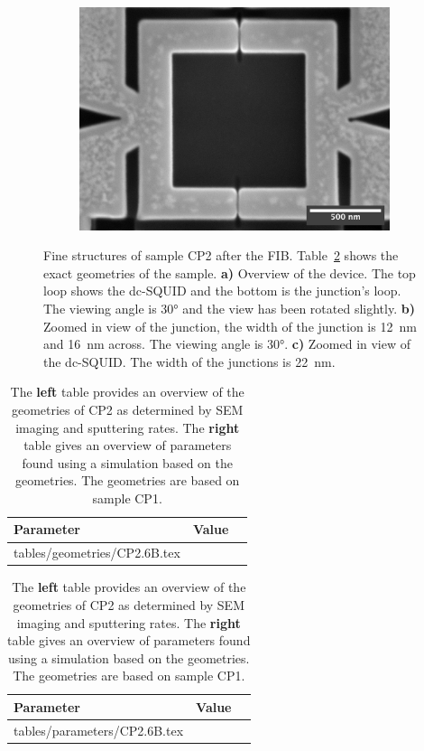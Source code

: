 \begin{figure}[ht!]
\begin{subfigure}[t]{0.3\textwidth}
	\end{subfigure}
	\hfill
	\begin{subfigure}[t]{0.3\textwidth}
		\centering
		\subcaption{}
		\includegraphics[width=\textwidth]{figures/samples/CP2/CP2.6B_SEM_SQUID.jpg}
	\end{subfigure}

	\caption{Fine structures of sample CP2 after the FIB. Table~\ref{tab:CP2.6B-geometries} shows the exact geometries of the sample. \textbf{a)} Overview of the device. The top loop shows the dc-SQUID and the bottom is the junction's loop. The viewing angle is \ang{30} and the view has been rotated slightly. \textbf{b)} Zoomed in view of the junction, the width of the junction is \qty{12}{\nano\meter} and \qty{16}{\nano\meter} across. The viewing angle is \ang{30}. \textbf{c)} Zoomed in view of the dc-SQUID. The width of the junctions is \qty{22}{\nano\meter}.}
	\label{fig:CP2.6B-SEM-images}
\end{figure}

\begin{table}
	\begin{subtable}{.6\linewidth}
		\begin{tabular}[t]{@{}lrr@{}}
			\toprule
			Parameter & Value \\ \midrule
			\expandableinput tables/geometries/CP2.6B.tex
			\bottomrule
		\end{tabular}
    \end{subtable}
    \hfill
    \begin{subtable}{.3\linewidth}
    	\flushright
    	\begin{tabular}[t]{@{}lrr@{}}
    		\toprule
    		Parameter & Value \\ \midrule
    		\expandableinput tables/parameters/CP2.6B.tex
    		\bottomrule
    	\end{tabular}
    \end{subtable}
    \caption{The \textbf{left} table provides an overview of the geometries of CP2 as determined by SEM imaging and sputtering rates. The \textbf{right} table gives an overview of parameters found using a simulation based on the geometries. The geometries are based on sample CP1.}
    \label{tab:CP2.6B-geometries}
\end{table}